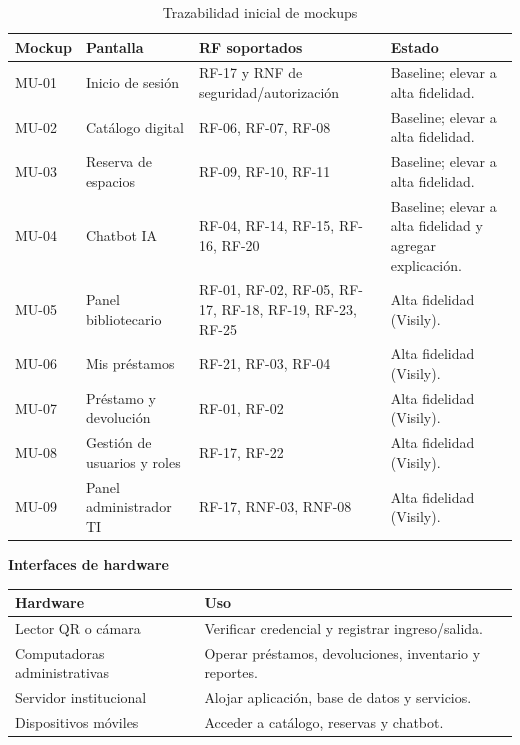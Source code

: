 \documentclass[12pt,journal,onecolumn]{IEEEtran}
\begin{document}
\begin{table}[H]\centering
\caption{Trazabilidad inicial de mockups}
\begin{tabularx}{\textwidth}{P{0.13\textwidth}P{0.28\textwidth}Y P{0.16\textwidth}}\toprule
\textbf{Mockup} & \textbf{Pantalla} & \textbf{RF soportados} & \textbf{Estado}\\\midrule
MU-01 & Inicio de sesión & RF-17 y RNF de seguridad/autorización & Baseline; elevar a alta fidelidad.\\
MU-02 & Catálogo digital & RF-06, RF-07, RF-08 & Baseline; elevar a alta fidelidad.\\
MU-03 & Reserva de espacios & RF-09, RF-10, RF-11 & Baseline; elevar a alta fidelidad.\\
MU-04 & Chatbot IA & RF-04, RF-14, RF-15, RF-16, RF-20 & Baseline; elevar a alta fidelidad y agregar explicación.\\
MU-05 & Panel bibliotecario & RF-01, RF-02, RF-05, RF-17, RF-18, RF-19, RF-23, RF-25 & Alta fidelidad (Visily).\\
MU-06 & Mis préstamos & RF-21, RF-03, RF-04 & Alta fidelidad (Visily).\\
MU-07 & Préstamo y devolución & RF-01, RF-02 & Alta fidelidad (Visily).\\
MU-08 & Gestión de usuarios y roles & RF-17, RF-22 & Alta fidelidad (Visily).\\
MU-09 & Panel administrador TI & RF-17, RNF-03, RNF-08 & Alta fidelidad (Visily).\\\bottomrule
\end{tabularx}
\end{table}

\medskip\noindent\textbf{Interfaces de hardware}\par\smallskip
\begin{tabularx}{\textwidth}{P{0.30\textwidth}Y}\toprule
\textbf{Hardware} & \textbf{Uso}\\\midrule
Lector QR o cámara & Verificar credencial y registrar ingreso/salida.\\
Computadoras administrativas & Operar préstamos, devoluciones, inventario y reportes.\\
Servidor institucional & Alojar aplicación, base de datos y servicios.\\
Dispositivos móviles & Acceder a catálogo, reservas y chatbot.\\\bottomrule
\end{tabularx}
\end{document}
